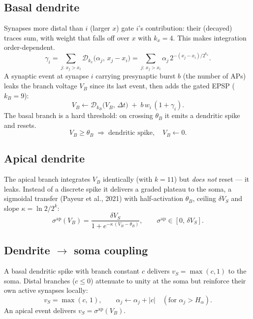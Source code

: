 \documentclass[11pt, a4paper]{article}
\begin{document}
\subsection{Basal dendrite}
Synapses more distal than $i$ (larger $x$) gate $i$'s contribution: their (decayed) traces sum, with
weight that falls off over $x$ with $k_x = 4$. This makes integration order-dependent.
\begin{equation}
    \gamma_i = \sum_{j:\, x_j > x_i} \mathcal{D}_{k_x}\!\big(\alpha_j,\, x_j - x_i\big)
             = \sum_{j:\, x_j > x_i} \alpha_j \, 2^{-(x_j - x_i)/2^{k_x}}.
\end{equation}
A synaptic event at synapse $i$ carrying presynaptic burst $b$ (the number of APs) leaks the branch
voltage $V_B$ since its last event, then adds the gated EPSP ($k_B = 9$):
\begin{equation}
    V_B \leftarrow \mathcal{D}_{k_B}\!\big(V_B,\, \Delta t\big) \;+\; b\, w_i \,(1 + \gamma_i).
\end{equation}
The basal branch is a hard threshold: on crossing $\theta_B$ it emits a dendritic spike and resets.
\begin{equation}
    V_B \ge \theta_B \;\Longrightarrow\; \text{dendritic spike}, \quad V_B \leftarrow 0.
\end{equation}

\subsection{Apical dendrite}
The apical branch integrates $V_B$ identically (with $k = 11$) but \emph{does not} reset --- it leaks.
Instead of a discrete spike it delivers a graded plateau to the soma, a sigmoidal transfer
(Payeur et al., 2021) with half-activation $\theta_B$, ceiling $\delta V_S$ and slope
$\kappa = \ln 2 / 2^{k}$:
\begin{equation}
    \sigma^{\mathrm{ap}}(V_B) = \frac{\delta V_S}{1 + e^{-\kappa\,(V_B - \theta_B)}}, \qquad
    \sigma^{\mathrm{ap}} \in [0,\, \delta V_S].
\end{equation}

\subsection{Dendrite $\to$ soma coupling}
A basal dendritic spike with branch constant $c$ delivers $v_S = \max(c, 1)$ to the soma. Distal
branches ($c \le 0$) attenuate to unity at the soma but reinforce their own active synapses locally:
\begin{equation}
    v_S = \max(c,\,1), \qquad
    \alpha_j \leftarrow \alpha_j + |c| \quad (\text{for } \alpha_j > H_\alpha).
\end{equation}
An apical event delivers $v_S = \sigma^{\mathrm{ap}}(V_B)$.
\end{document}
